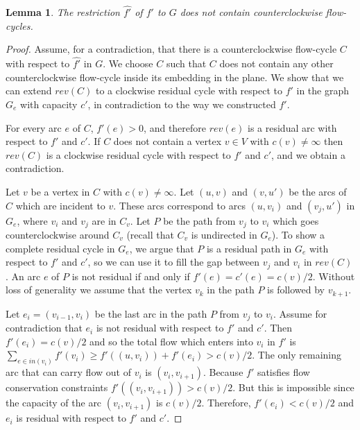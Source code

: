 \documentclass[a4paper,11pt]{article}
\newtheorem{lemma}[theorem]{Lemma}
\begin{document}
\begin{lemma}
The restriction
$\hat{f'}$ of $f'$ to $G$ does not contain counterclockwise flow-cycles.
\end{lemma}
\begin{proof}
  Assume, for a contradiction, that there is a counterclockwise flow-cycle $C$
  with respect to $\hat{f'}$ in $G$. We choose $C$ such that $C$ does
  not contain any other counterclockwise flow-cycle inside its embedding in
  the plane. We show that we can extend $rev(C)$ to a clockwise residual cycle
  with respect to $f'$ in the graph $G_e$ with capacity $c'$,
in contradiction to the way we constructed $f'$.

For every arc $e$ of $C$, $f'(e) > 0$, and therefore $rev(e)$ is a residual arc
with respect to $f'$ and $c'$. If $C$ does not contain a vertex $v \in V$ with
$c(v) \neq \infty$ then $rev(C)$ is a clockwise residual cycle with respect to
$f'$ and $c'$, and we obtain a contradiction.

Let $v$ be a vertex in $C$ with $c(v) \neq
\infty$. Let $(u, v)$ and $(v, u')$ be the arcs of $C$ which are incident to $v$.
These arcs correspond to arcs $(u, v_i)$ and $(v_j, u')$ in $G_e$,
where $v_i$ and $v_j$ are in $C_v$.
Let $P$ be the path from $v_j$ to $v_i$ which goes counterclockwise around
$C_v$ (recall that $C_v$ is undirected in $G_e$).
To show a complete residual cycle in $G_e$, we argue that $P$ is a residual path
in $G_e$ with respect to $f'$ and $c'$, so we can use it to fill the gap between
$v_j$ and $v_i$ in $rev(C)$.
An arc $e$ of $P$ is not residual if
and only if $f'(e) = c'(e) = c(v)/2$.
Without loss of generality we
assume that the vertex $v_k$ in the path $P$ is followed by $v_{k+1}$.

Let $e_i = (v_{i-1}, v_i)$ be the last arc in the path $P$ from $v_j$ to
$v_i$.
Assume for contradiction that $e_i$ is not residual with respect to $f'$
and $c'$. Then $f'(e_i) = c(v)/2$ and so the total flow which enters into
$v_i$ in $f'$ is $\sum_{e \in in(v_i)} f'(v_i) \geq f'((u, v_i)) +
f'(e_i) > c(v)/2$. The only remaining arc that can carry flow
out of $v_i$ is $(v_i, v_{i+1})$. Because $f'$ satisfies flow
conservation constraints $f'((v_i, v_{i+1})) > c(v)/2$.
But this is impossible since the capacity of the arc $(v_i, v_{i+1})$ is
$c(v)/2$. Therefore, $f'(e_i) < c(v)/2$ and $e_i$ is residual
with respect to $f'$ and $c'$.


\end{proof}
\end{document}
